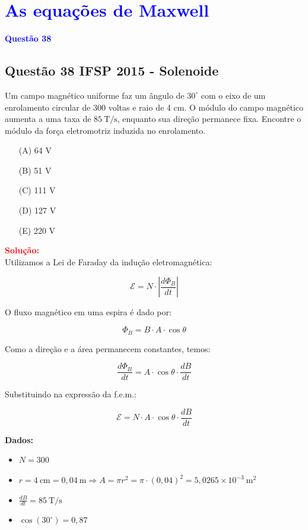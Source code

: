 \section{\large \textcolor{blue}{As equações de Maxwell}}

\begin{flushleft}
\textbf{\textcolor{blue}{\Large Quest\~ao 38}}\\
\noindent

\subsection{Quest\~ao 38 IFSP 2015 - Solenoide}
Um campo magn\'etico uniforme faz um \^angulo de $30^\circ$ com o eixo de um enrolamento circular de 
300 voltas e raio de 4 cm. O m\'odulo do campo magn\'etico aumenta a uma taxa de $85\ \text{T/s}$, enquanto 
sua dire\c{c}\~ao permanece fixa. Encontre o m\'odulo da for\c{c}a eletromotriz induzida no enrolamento. 


\begin{itemize}
\item[(A)] 64 V
\item[(B)] 51 V
\item[(C)] 111 V
\item[(D)] 127 V
\item[(E)] 220 V
\end{itemize}

\vspace{0.5cm}

\textcolor{red}{\textbf{Solução:}}\\

Utilizamos a Lei de Faraday da indu\c{c}\~ao eletromagn\'etica:

\[
\mathcal{E} = N \cdot \left| \frac{d\Phi_B}{dt} \right|
\]

O fluxo magn\'etico em uma espira \'e dado por:

\[
\Phi_B = B \cdot A \cdot \cos\theta
\]

Como a dire\c{c}\~ao e a \'area permanecem constantes, temos:

\[
\frac{d\Phi_B}{dt} = A \cdot \cos\theta \cdot \frac{dB}{dt}
\]

Substituindo na express\~ao da f.e.m.:

\[
\mathcal{E} = N \cdot A \cdot \cos\theta \cdot \frac{dB}{dt}
\]

\textbf{Dados:}
\begin{itemize}
    \item $N = 300$
    \item $r = 4\ \text{cm} = 0{,}04\ \text{m} \Rightarrow A = \pi r^2 = \pi \cdot (0{,}04)^2 = 5{,}0265 \times 10^{-3}\ \text{m}^2$
    \item $\frac{dB}{dt} = 85\ \text{T/s}$
    \item $\cos(30^\circ) = 0{,}87$
\end{itemize}


\end{flushleft}
